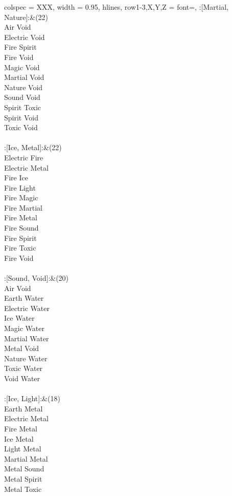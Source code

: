 \begin{longtblr}[
	caption = {2v2 Attacking Ineffective},
	label = {2v2-Attacking-Ineffective},
]{
	colspec = {XXX}, width = 0.95\linewidth,
	hlines,
	row{1-3,X,Y,Z} = {font=\bfseries},
}
	:[Martial, Nature]:&{(22)\\
	Air Void \\
	Electric Void \\
	Fire Spirit \\
	Fire Void \\
	Magic Void \\
	Martial Void \\
	Nature Void \\
	Sound Void \\
	Spirit Toxic \\
	Spirit Void \\
	Toxic Void \\
	}\\

	:[Ice, Metal]:&{(22)\\
	Electric Fire \\
	Electric Metal \\
	Fire Ice \\
	Fire Light \\
	Fire Magic \\
	Fire Martial \\
	Fire Metal \\
	Fire Sound \\
	Fire Spirit \\
	Fire Toxic \\
	Fire Void \\
	}\\

	:[Sound, Void]:&{(20)\\
	Air Void \\
	Earth Water \\
	Electric Water \\
	Ice Water \\
	Magic Water \\
	Martial Water \\
	Metal Void \\
	Nature Water \\
	Toxic Water \\
	Void Water \\
	}\\

	:[Ice, Light]:&{(18)\\
	Earth Metal \\
	Electric Metal \\
	Fire Metal \\
	Ice Metal \\
	Light Metal \\
	Martial Metal \\
	Metal Sound \\
	Metal Spirit \\
	Metal Toxic \\
	}\\


\end{longtblr}
